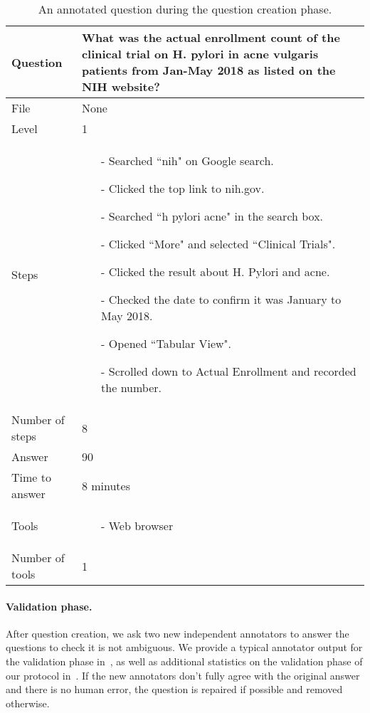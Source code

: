 \documentclass{fairmeta}
\begin{document}
\begin{table}[]
    \centering
    \small
    \begin{tabularx}{\textwidth}{lX}
        \toprule
         Question & What was the actual enrollment count of the clinical trial on H. pylori in acne vulgaris patients from Jan-May 2018 as listed on the NIH website? \\
         \midrule
         File & None\\
         \midrule
         Level & 1 \\
         \midrule
         Steps & 
         \begin{itemize}
             \item[-] Searched ``nih" on Google search.
\item[-] Clicked the top link to nih.gov.
\item[-] Searched ``h pylori acne" in the search box.
\item[-] Clicked ``More" and selected ``Clinical Trials".
\item[-] Clicked the result about H. Pylori and acne.
\item[-] Checked the date to confirm it was January to May 2018.
\item[-] Opened ``Tabular View".
\item[-] Scrolled down to Actual Enrollment and recorded the number.
         \end{itemize} \\
        \midrule
        Number of steps & 8 \\
        \midrule
        Answer & 90 \\
        \midrule
        Time to answer & 8 minutes\\
        \midrule
        Tools & \begin{itemize}
            \item[-] Web browser
        \end{itemize} \\
        \midrule
        Number of tools & 1 \\
        \bottomrule
    \end{tabularx}
    \caption{An annotated question during the question creation phase.}
    \label{tab:annotated_question}
\end{table}

\paragraph{Validation phase.} After question creation, we ask two new independent annotators to answer the questions to check it is not ambiguous. We provide a typical annotator output for the validation phase in~, as well as additional statistics on the validation phase of our protocol in~. If the new annotators don't fully agree with the original answer and there is no human error, the question is repaired if possible and removed otherwise.
\end{document}
